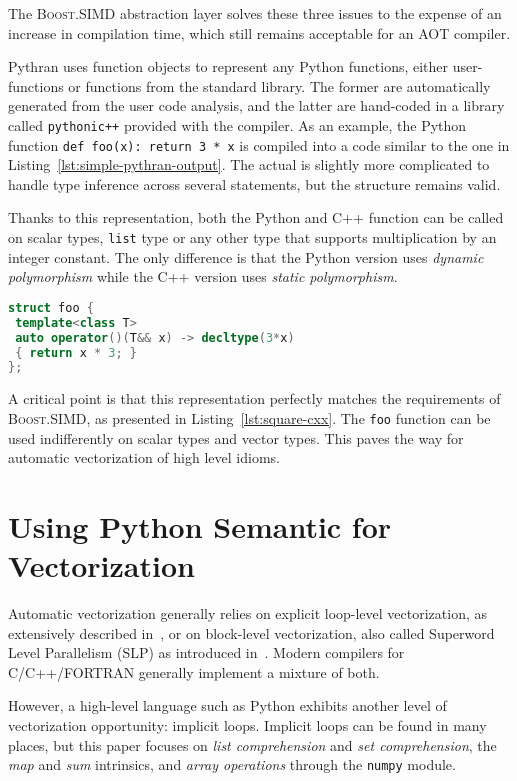 \documentclass[10pt]{sigplanconf}
\providecommand{\boostsimd}{\textsc{Boost.SIMD}}
\begin{document}
The \boostsimd{} abstraction layer solves these three issues to the expense of
an increase in compilation time, which still remains acceptable for an AOT
compiler.

Pythran uses function objects to represent any Python functions, either
user-functions or functions from the standard library. The former are
automatically generated from the user code analysis, and the latter are
hand-coded in a library called \texttt{pythonic++} provided with the compiler.
As an example, the Python function \texttt{def foo(x): return 3 * x} is compiled
into a code similar to the one in Listing~\ref{lst:simple-pythran-output}. The
actual is slightly more complicated to handle type inference across several
statements, but the structure remains valid.

Thanks to this representation, both the Python and C++ function can be called
on scalar types, \texttt{list} type or any other type that supports
multiplication by an integer constant. The only difference is that the Python
version uses \emph{dynamic polymorphism} while the C++ version uses
\emph{static polymorphism}.

\begin{lstlisting}[language=c++, caption={Simplified Pythran Translation of a Polymorphic Function}, label={lst:simple-pythran-output}]
struct foo {
 template<class T>
 auto operator()(T&& x) -> decltype(3*x)
 { return x * 3; }
};
\end{lstlisting}

A critical point is that this representation perfectly matches the requirements
of \boostsimd, as presented in Listing~\ref{lst:square-cxx}. The \texttt{foo}
function can be used indifferently on scalar types and vector types. This paves
the way for automatic vectorization of high level idioms.

\section{Using Python Semantic for Vectorization}
\label{sec:python-semantic}

Automatic vectorization generally relies on explicit loop-level vectorization, as
extensively described in~\cite{bik04}, or on block-level vectorization, also
called Superword Level Parallelism (SLP) as introduced in~\cite{larsen00}.
Modern compilers for C/C++/FORTRAN generally implement a mixture of both.

However, a high-level language such as Python exhibits another level of
vectorization opportunity: implicit loops. Implicit loops can be found in many
places, but this paper focuses on \emph{list comprehension} and \emph{set
comprehension}, the \emph{map} and \emph{sum} intrinsics, and \emph{array
operations} through the \texttt{numpy} module.
\end{document}
